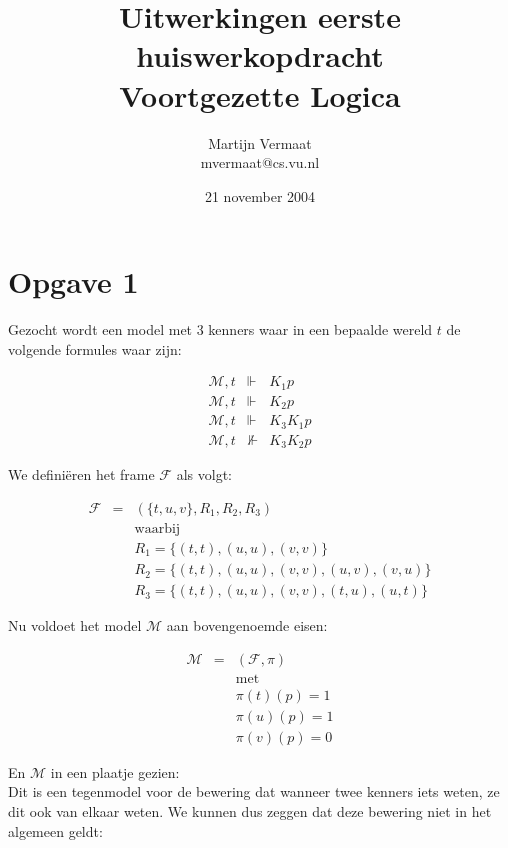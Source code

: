 \documentclass[a4paper,11pt]{article}
\title{Uitwerkingen eerste huiswerkopdracht\\Voortgezette Logica}
\author{
    Martijn Vermaat\\
    mvermaat@cs.vu.nl
}
\date{21 november 2004}
\begin{document}
\maketitle


\section*{Opgave 1}

Gezocht wordt een model met 3 kenners waar in een bepaalde wereld
$t$ de volgende formules waar zijn:

\begin{eqnarray*}
\mathcal{M},t & \Vdash & K_{1} p        \\
\mathcal{M},t & \Vdash & K_{2} p        \\
\mathcal{M},t & \Vdash & K_{3} K_{1} p  \\
\mathcal{M},t & \nVdash & K_{3} K_{2} p
\end{eqnarray*}

We defini\"eren het frame $\mathcal{F}$ als volgt:

\begin{eqnarray*}
\mathcal{F} & = & (\{t,u,v\}, R_{1}, R_{2}, R_{3}) \\
& & \mbox{waarbij}                                 \\
& & R_{1} = \{(t,t), (u,u), (v,v)\}                \\
& & R_{2} = \{(t,t), (u,u), (v,v), (u,v), (v,u)\}  \\
& & R_{3} = \{(t,t), (u,u), (v,v), (t,u), (u,t)\}
\end{eqnarray*}

Nu voldoet het model $\mathcal{M}$ aan bovengenoemde eisen:

\begin{eqnarray*}
\mathcal{M} & = & (\mathcal{F}, \pi) \\
& & \mbox{met}                       \\
& & \pi(t)(p) = 1                    \\
& & \pi(u)(p) = 1                    \\
& & \pi(v)(p) = 0
\end{eqnarray*}

En $\mathcal{M}$ in een plaatje gezien:\\[1em]



Dit is een tegenmodel voor de bewering dat wanneer twee kenners iets
weten, ze dit ook van elkaar weten. We kunnen dus zeggen dat deze
bewering niet in het algemeen geldt:
\end{document}
